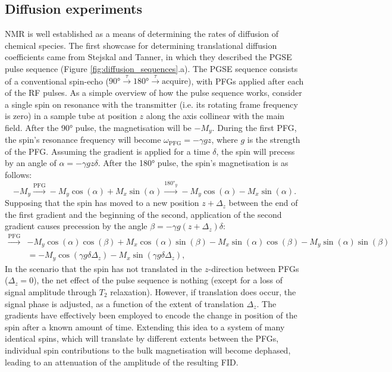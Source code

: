 \subsection{Diffusion experiments}
\label{sec:diffusion_experiments}
\ac{NMR} is well established as a means of determining the rates of diffusion of chemical species\cite{Johnson1999,Morris2009b}.
The first showcase for determining translational diffusion coefficients came
from Stejskal and Tanner, in which they described the \ac{PGSE} pulse
sequence\cite{Stejskal1965} (Figure \ref{fig:diffusion_sequences}.a).
The \ac{PGSE} sequence consists of a conventional spin-echo ($\ang{90}
\xrightarrow{\tau} \ang{180} \xrightarrow{\tau} \text{acquire}$), with
\acp{PFG} applied after each of the \ac{RF} pulses.
As a simple overview of how the pulse sequence works, consider a single spin on
resonance with the transmitter (i.e. its rotating frame frequency is zero) in a
sample tube at position $z$ along the axis collinear with the main field.
After the \ang{90} pulse, the magnetisation will be $-M_y$.
During the first \ac{PFG}, the spin's resonance frequency will become
$\omega_{\text{PFG}} = -\gamma g z$, where $g$ is the strength of the \ac{PFG}.
Assuming the gradient is applied for a time $\delta$, the spin will
precess by an angle of  $\alpha = -\gamma g z \delta$. After the \ang{180}
pulse, the spin's magnetisation is as follows:
\[
    -M_y
    \xrightarrow{\text{PFG}} -M_y \cos(\alpha) + M_x \sin(\alpha)
    \xrightarrow{\ang{180}_y} -M_y \cos(\alpha) - M_x \sin(\alpha).
\]
Supposing that the spin has moved to a new position $z + \Delta_z$
between the end of the first gradient and the beginning of the second,
application of the second gradient causes precession by the angle
$\beta = -\gamma g (z + \Delta_z) \delta$:
\begin{equation*}
   \begin{split}
        \xrightarrow{\text{PFG}}
            &-M_y \cos(\alpha)\cos(\beta) +
            M_x \cos(\alpha)\sin(\beta) -
            M_x \sin(\alpha)\cos(\beta) -
            M_y \sin(\alpha)\sin(\beta)\\
        &= -M_y \cos(\gamma g \delta \Delta_z) -
           M_x \sin(\gamma g \delta \Delta_z),
   \end{split}
\end{equation*}
In the scenario that the spin has not translated in the $z$-direction between
\acp{PFG} ($\Delta_z = 0$), the net effect of the pulse sequence is nothing
(except for a loss of signal amplitude through $T_2$ relaxation). However, if
translation does occur, the signal phase is adjusted, as a function of the
extent of translation $\Delta_z$. The gradients have effectively been employed
to encode the change in position of the spin after a known amount of time.
Extending this idea to a system of many identical spins, which will translate
by different extents between the \acp{PFG}, individual spin contributions to
the bulk magnetisation will become dephased, leading to an attenuation of the
amplitude of the resulting FID.

